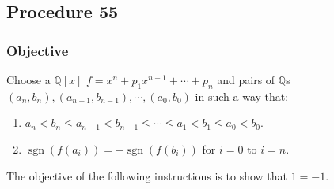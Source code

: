 \documentclass[twocolumn]{article}
\DeclareMathOperator{\sgn}{sgn}
\begin{document}
		\subsection{Procedure 55}\label{sec:procedure 55}
			\subsubsection{Objective}
				Choose a $\mathbb{Q}[x]$ $f=x^n+p_1x^{n-1}+\cdots+p_n$ and pairs of $\mathbb{Q}$s $(a_n,b_n),(a_{n-1},b_{n-1}),\cdots,(a_0,b_0)$ in such a way that:
				\begin{enumerate}
					\item $a_n<b_n\le a_{n-1}<b_{n-1}\le\cdots\le a_1<b_1\le a_0<b_0$.
					\item $\sgn(f(a_i))=-\sgn(f(b_i))$ for $i=0$ to $i=n$.
				\end{enumerate}
				The objective of the following instructions is to show that $1=-1$.
\end{document}
